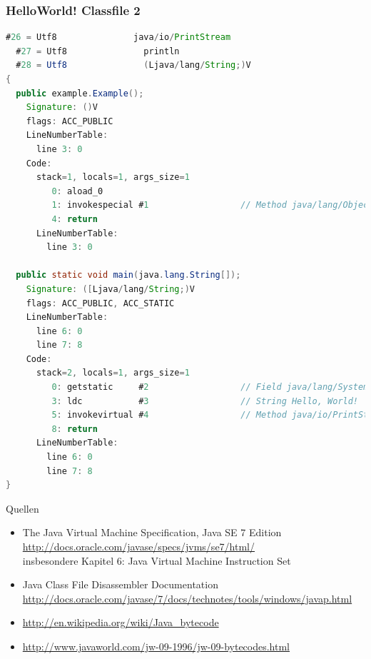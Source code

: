 \documentclass[10pt]{beamer}
\begin{document}
\begin{frame}[fragile]
\frametitle{HelloWorld! Classfile 2}
\begin{lstlisting}[language=Java,basicstyle=\ttfamily\tiny]
  #26 = Utf8               java/io/PrintStream
  #27 = Utf8               println
  #28 = Utf8               (Ljava/lang/String;)V
{
  public example.Example();
    Signature: ()V
    flags: ACC_PUBLIC
    LineNumberTable:
      line 3: 0
    Code:
      stack=1, locals=1, args_size=1
         0: aload_0       
         1: invokespecial #1                  // Method java/lang/Object."<init>":()V
         4: return        
      LineNumberTable:
        line 3: 0

  public static void main(java.lang.String[]);
    Signature: ([Ljava/lang/String;)V
    flags: ACC_PUBLIC, ACC_STATIC
    LineNumberTable:
      line 6: 0
      line 7: 8
    Code:
      stack=2, locals=1, args_size=1
         0: getstatic     #2                  // Field java/lang/System.out:Ljava/io/PrintStream;
         3: ldc           #3                  // String Hello, World!
         5: invokevirtual #4                  // Method java/io/PrintStream.println:(Ljava/lang/String;)V
         8: return        
      LineNumberTable:
        line 6: 0
        line 7: 8
}
\end{lstlisting}
\end{frame}


\begin{frame}{Quellen}
\begin{itemize}
\item The Java Virtual Machine Specification, Java SE 7 Edition\\
\url{http://docs.oracle.com/javase/specs/jvms/se7/html/}\\
insbesondere Kapitel 6: Java Virtual Machine Instruction Set
\item Java Class File Disassembler Documentation\\
\url{http://docs.oracle.com/javase/7/docs/technotes/tools/windows/javap.html}
\item \url{http://en.wikipedia.org/wiki/Java_bytecode}
\item \url{http://www.javaworld.com/jw-09-1996/jw-09-bytecodes.html}
\end{itemize}
\end{frame}
\end{document}
